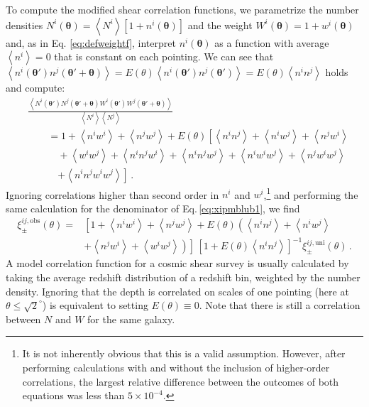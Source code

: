 \documentclass{aa}
\renewcommand{\rm}{\mathrm}
\def\inv{^{-1}}
\def\b#1{\bm{#1}}
\def\la{\left<}
\def\ra{\right>}
\def\d{\rm{d}}
\def\bthp{\b \theta' + \b \theta}
\def\bth{\b \theta'}
\begin{document}
To compute the modified shear correlation functions, we parametrize the number densities \linebreak$N^{i}(\b \theta)=\la N^{i} \ra [1+n^{i}(\b \theta)]$ and the weight $W^{i}(\b \theta)=1+w^{i}(\b \theta)$ and, as in Eq. \eqref{eq:defweightf}, interpret $n^{i}(\b \theta)$ as a function with average $\la n^{i} \ra = 0$ that is constant on each pointing. We can see that $\la n^i(\bth)n^j(\bthp)\ra = E(\theta)\la n^i(\bth)n^j(\bth)\ra = E(\theta)\la n^i n^j \ra$ holds and compute:
\begin{align}
&\frac{\la N^i(\bth)N^j(\bthp)W^i(\bth)W^j(\bthp)\ra}{\la N^i\ra \la N^j\ra } \nonumber\\
&\qquad =  1 + \la n^iw^i\ra + \la n^j w^j\ra + E(\theta)\left[ \la n^in^j\ra + \la n^i w^j \ra  + \la n^jw^i\ra \right. \nonumber\\
& \qquad\quad + \la w^iw^j\ra + \la n^in^jw^i\ra + \la n^in^jw^j\ra + \la n^iw^iw^j\ra 
+ \la n^jw^iw^j\ra \nonumber\\
& \qquad\quad\left.+ \la n^in^jw^iw^j\ra  \right] \, .
 \end{align}
Ignoring correlations higher than second order in $n^i$ and $w^i$,\footnote{It is not inherently obvious that this is a valid assumption. However, after performing calculations with and without the inclusion of higher-order correlations, the largest relative difference between the outcomes of both equations was less than $5\times 10^{-4}$.} and performing the same calculation for the denominator of Eq.\,\eqref{eq:xipmblub1}, we find
 \begin{align}
 \xi^{ij,\rm{obs}}_\pm(\theta) = & \left[ 1 + \la n^iw^i\ra + \la n^jw^j\ra + E(\theta)\left(\la n^in^j\ra + \la n^iw^j\ra \right.\right. \nonumber\\
 &\left.\left. + \la n^j w^i\ra + \la w^iw^j\ra\right)\right]\, \left[1+E(\theta)\la n^i n^j\ra \right]\inv\xi^{ij,\rm{uni}}_\pm (\theta) \, .
 \end{align}
 A model correlation function for a cosmic shear survey is usually calculated by taking the average redshift distribution of a redshift bin, weighted by the number density.
 Ignoring that the depth is correlated on scales of one pointing (here at $\theta \leq \sqrt{2}^\circ$) is equivalent to setting $E(\theta)\equiv 0$. Note that there is still a correlation between $N$ and $W$ for the same galaxy.
\end{document}
